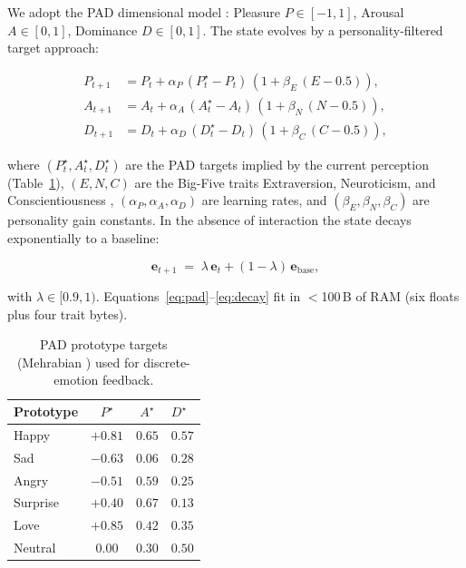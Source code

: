 \documentclass{article}
\theoremstyle{definition}
\begin{document}
We adopt the PAD dimensional model \cite{mehrabian1996pad}:
Pleasure $P \in [-1,1]$, Arousal $A \in [0,1]$, Dominance $D \in [0,1]$.
The state evolves by a personality-filtered target approach:

\begin{equation}
\begin{aligned}
P_{t+1} &= P_t + \alpha_P\,(P^{\star}_t - P_t)\,(1 + \beta_E\,(E - 0.5)), \\
A_{t+1} &= A_t + \alpha_A\,(A^{\star}_t - A_t)\,(1 + \beta_N\,(N - 0.5)), \\
D_{t+1} &= D_t + \alpha_D\,(D^{\star}_t - D_t)\,(1 + \beta_C\,(C - 0.5)),
\end{aligned}
\label{eq:pad}
\end{equation}

where $(P^{\star}_t, A^{\star}_t, D^{\star}_t)$ are the PAD targets implied by the
current perception (Table~\ref{tab:prototypes}), $(E,N,C)$ are the Big-Five
traits Extraversion, Neuroticism, and Conscientiousness \cite{mccrae1992introduction},
$(\alpha_P,\alpha_A,\alpha_D)$ are learning rates, and $(\beta_E,\beta_N,\beta_C)$
are personality gain constants. In the absence of interaction the state decays
exponentially to a baseline:

\begin{equation}
\mathbf{e}_{t+1} \;=\; \lambda\,\mathbf{e}_t + (1-\lambda)\,\mathbf{e}_{\text{base}},
\label{eq:decay}
\end{equation}

with $\lambda \in [0.9, 1)$. Equations~\eqref{eq:pad}--\eqref{eq:decay} fit in
$<$100\,B of RAM (six floats plus four trait bytes).

\begin{table}[t]
\centering
\small
\begin{tabular}{lccl}
\toprule
\textbf{Prototype} & $P^{\star}$ & $A^{\star}$ & $D^{\star}$ \\
\midrule
Happy    & $+0.81$ & $0.65$ & $0.57$ \\
Sad      & $-0.63$ & $0.06$ & $0.28$ \\
Angry    & $-0.51$ & $0.59$ & $0.25$ \\
Surprise & $+0.40$ & $0.67$ & $0.13$ \\
Love     & $+0.85$ & $0.42$ & $0.35$ \\
Neutral  & $ 0.00$ & $0.30$ & $0.50$ \\
\bottomrule
\end{tabular}
\caption{PAD prototype targets (Mehrabian \cite{mehrabian1996pad}) used for
discrete-emotion feedback.}
\label{tab:prototypes}
\end{table}
\end{document}
